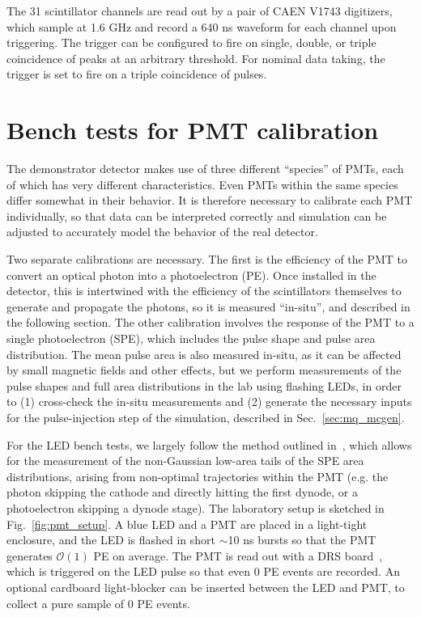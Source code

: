 {The 31 scintillator channels are read out by a pair of CAEN V1743 digitizers, which sample at 1.6 GHz
and record a 640 ns waveform for each channel upon triggering. The trigger can be configured
to fire on single, double, or triple coincidence of peaks at an arbitrary threshold.
For nominal data taking, the trigger is set to fire on a triple coincidence of pulses.

\section{Bench tests for PMT calibration}
\label{sec:pmt_bench_tests}

The demonstrator detector makes use of three different ``species'' of PMTs, each of which
has very different characteristics. Even PMTs within the same species differ somewhat
in their behavior. It is therefore necessary to calibrate each PMT individually, so
that data can be interpreted correctly and simulation can be adjusted to accurately
model the behavior of the real detector.

Two separate calibrations are necessary. The first is the efficiency of the PMT
to convert an optical photon into a photoelectron (PE). Once installed in the detector, 
this is intertwined with the efficiency of the scintillators themselves to generate
and propagate the photons, so it is measured ``in-situ'', and described in the following
section. The other calibration involves the response of the PMT to a single photoelectron (SPE),
which includes the pulse shape and pulse area distribution. The mean pulse area
is also measured in-situ, as it can be affected by small magnetic fields and other effects,
but we perform measurements of the pulse shapes and full area distributions in the lab
using flashing LEDs, in order to (1) cross-check the in-situ measurements
and (2) generate the necessary inputs for the pulse-injection step of the simulation,
described in Sec.~\ref{sec:mq_mcgen}.

For the LED bench tests, we largely follow the method outlined in~\cite{Saldanha:pmt},
which allows for the measurement of the non-Gaussian low-area
tails of the SPE area distributions, arising from non-optimal trajectories
within the PMT (e.g. the photon skipping the cathode and directly hitting
the first dynode, or a photoelectron skipping a dynode stage).
The laboratory setup is sketched in Fig.~\ref{fig:pmt_setup}.
A blue LED and a PMT are placed in a light-tight enclosure,
and the LED is flashed in short $\sim$10 ns bursts so that the PMT
generates $\mathcal{O}(1)$ PE on average. The PMT is read out with
a DRS board~\cite{drs}, which is triggered on the LED pulse
so that even 0 PE events are recorded. An optional cardboard light-blocker
can be inserted between the LED and PMT, to collect a pure sample of 0 PE events.

}
